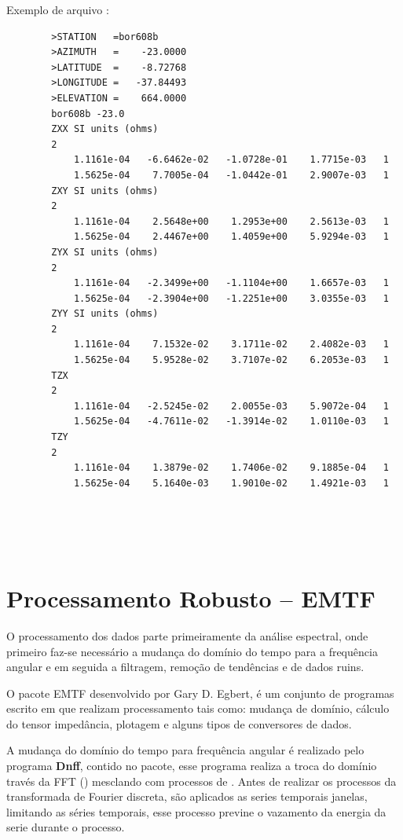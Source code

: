         Exemplo de arquivo :
        
\begin{footnotesize}        
\begin{verbatim}
        >STATION   =bor608b
        >AZIMUTH   =    -23.0000
        >LATITUDE  =    -8.72768
        >LONGITUDE =   -37.84493
        >ELEVATION =    664.0000
        bor608b -23.0
        ZXX SI units (ohms)
        2
            1.1161e-04   -6.6462e-02   -1.0728e-01    1.7715e-03   1
            1.5625e-04    7.7005e-04   -1.0442e-01    2.9007e-03   1
        ZXY SI units (ohms)
        2
            1.1161e-04    2.5648e+00    1.2953e+00    2.5613e-03   1
            1.5625e-04    2.4467e+00    1.4059e+00    5.9294e-03   1
        ZYX SI units (ohms)
        2
            1.1161e-04   -2.3499e+00   -1.1104e+00    1.6657e-03   1
            1.5625e-04   -2.3904e+00   -1.2251e+00    3.0355e-03   1
        ZYY SI units (ohms)
        2
            1.1161e-04    7.1532e-02    3.1711e-02    2.4082e-03   1
            1.5625e-04    5.9528e-02    3.7107e-02    6.2053e-03   1
        TZX
        2
            1.1161e-04   -2.5245e-02    2.0055e-03    5.9072e-04   1
            1.5625e-04   -4.7611e-02   -1.3914e-02    1.0110e-03   1
        TZY
        2
            1.1161e-04    1.3879e-02    1.7406e-02    9.1885e-04   1
            1.5625e-04    5.1640e-03    1.9010e-02    1.4921e-03   1
            
            
            
            
\end{verbatim}
\end{footnotesize}
    
    \section{Processamento Robusto -- EMTF}
        \label{sec-robusto}
        
            O processamento dos dados parte primeiramente da análise espectral, onde primeiro faz-se necessário a mudança do domínio do tempo para a frequência angular e em seguida a filtragem, remoção de tendências e de dados ruins.
            
            O pacote EMTF \cite{egbert-emtf} desenvolvido por Gary D. Egbert, é um conjunto de programas escrito em  que realizam processamento tais como: mudança de domínio, cálculo do tensor impedância, plotagem e alguns tipos de conversores de dados. 
            
            A mudança do domínio do tempo para frequência angular é realizado pelo programa \textbf{Dnff}, contido no pacote, esse programa realiza a troca do domínio través da FFT () mesclando com processos de  . Antes de realizar os processos da transformada de Fourier discreta, são aplicados as series temporais janelas, limitando as séries temporais, esse processo previne o vazamento da energia da serie durante o processo.
            
